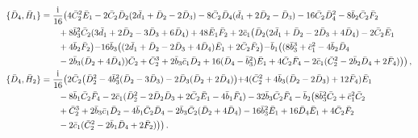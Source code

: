 \documentclass[10pt]{amsart}
\theoremstyle{definition}
\theoremstyle{corollary}
\theoremstyle{remark}
\theoremstyle{conclusion}
\begin{document}
\begin{align}
\{\bar{D}_4, \bar{H}_1\}&=\frac{{\rm i}}{16}\bigl(4 \bar{C}_2^2 \bar{E}_1-2 \bar{C}_2 \bar{D}_2(2 \bar{d}_1+\bar{D}_2-2 \bar{D}_3)-8 \bar{C}_2 \bar{D}_4(\bar{d}_1+2\bar{D}_2-\bar{D}_3)-16 \bar{C}_2 \bar{D}_4^2-8 \bar{b}_2 \bar{C}_2 \bar{F}_2\nonumber \\
& \hskip 0.7 cm +8 \bar{b}_3^2 \bar{C}_2(3 \bar{d}_1+2\bar{D}_2-3 \bar{D}_3+6 \bar{D}_4)+48 \bar{E}_1 \bar{F}_2+2 \bar{c}_1\bigl( \bar{D}_2(2\bar{d}_1+\bar{D}_2-2 \bar{D}_3+4\bar{D}_4)-2\bar{C}_2 \bar{E}_1 \nonumber \\
& \hskip 0.7 cm +4\bar{b}_2 \bar{F}_2\bigl) -16 \bar{b}_3\bigl((2 \bar{d}_1+\bar{D}_2-2 \bar{D}_3+4\bar{D}_4)\bar{E}_1+2\bar{C}_2 \bar{F}_2 \bigl) -\bar{b}_1 \bigl((8\bar{b}_3^3+\bar{c}_1^2-4\bar{b}_2 \bar{D}_4 \nonumber\\
& \hskip 0.7 cm -2\bar{b}_3(\bar{D}_2+4\bar{D}_4))\bar{C}_2 +\bar{C}_2^3+2\bar{b}_3 \bar{c}_1 \bar{D}_2+16(\bar{D}_4-\bar{b}_3^2)\bar{E}_1+4 \bar{C}_2 \bar{F}_4-2\bar{c}_1(\bar{C}_2^2-2\bar{b}_2 \bar{D}_4+2\bar{F}_4)\bigl)\bigl) \, ,\nonumber \\
\{\bar{D}_4, \bar{H}_2\}&=\frac{{\rm i}}{16} \bigl(2\bar{C}_2\bigl(\bar{D}_2^2-4\bar{b}_3^2(\bar{D}_2-3\bar{D}_3)-2\bar{D}_3(\bar{D}_2+2\bar{D}_4)\bigl)+4(\bar{C}_2^2+4\bar{b}_3 (\bar{D}_2-2\bar{D}_3)+12 \bar{F}_4)\bar{E}_1\nonumber\\
& \hskip 0.7 cm -8 \bar{b}_1 \bar{C}_2 \bar{F}_4-2 \bar{c}_1(\bar{D}_2^2-2\bar{D}_2 \bar{D}_3+2\bar{C}_2 \bar{E}_1-4\bar{b}_1 \bar{F}_4) -32 \bar{b}_3 \bar{C}_2 \bar{F}_4-\bar{b}_2\bigl(8 \bar{b}_3^2 \bar{C}_2+\bar{c}_1^2 \bar{C}_2\nonumber\\
& \hskip 0.7 cm +\bar{C}_2^3+2 \bar{b}_3 \bar{c}_1 \bar{D}_2-4 \bar{b}_1 \bar{C}_2 \bar{D}_4-2 \bar{b}_3 \bar{C}_2(\bar{D}_2+4\bar{D}_4)-16 \bar{b}_3^2\bar{E}_1+16 \bar{D}_4 \bar{E}_1 +4 \bar{C}_2 \bar{F}_2\nonumber\\
& \hskip 0.7 cm-2 \bar{c}_1(\bar{C}_2^2-2\bar{b}_1\bar{D}_4+2\bar{F}_2)\bigl)\bigl) \, .%
\end{align}
\end{document}
